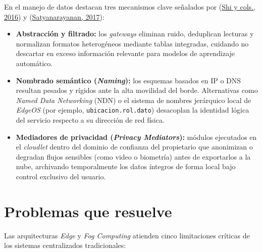 \documentclass[12pt, letterpaper]{article}
\begin{document}
En el manejo de datos destacan tres mecanismos clave señalados por (\protect\hyperlink{shi2016}{Shi y cols., 2016}) y (\protect\hyperlink{satyanarayanan2017}{Satyanarayanan, 2017}):

\begin{itemize}
    \item \textbf{Abstracción y filtrado:} los \textit{gateways} eliminan ruido, deduplican lecturas y normalizan formatos heterogéneos mediante tablas integradas, cuidando no descartar en exceso información relevante para modelos de aprendizaje automático.
    \item \textbf{Nombrado semántico (\textit{Naming}):} los esquemas basados en IP o DNS resultan pesados y rígidos ante la alta movilidad del borde. Alternativas como \textit{Named Data Networking} (NDN) o el sistema de nombres jerárquico local de \textit{EdgeOS} (por ejemplo, \texttt{ubicacion.rol.dato}) desacoplan la identidad lógica del servicio respecto a su dirección de red física.
    \item \textbf{Mediadores de privacidad (\textit{Privacy Mediators}):} módulos ejecutados en el \textit{cloudlet} dentro del dominio de confianza del propietario que anonimizan o degradan flujos sensibles (como video o biometría) antes de exportarlos a la nube, archivando temporalmente los datos íntegros de forma local bajo control exclusivo del usuario.
\end{itemize}

\section{Problemas que resuelve}

Las arquitecturas \textit{Edge} y \textit{Fog Computing} atienden cinco limitaciones críticas de los sistemas centralizados tradicionales:
\end{document}
